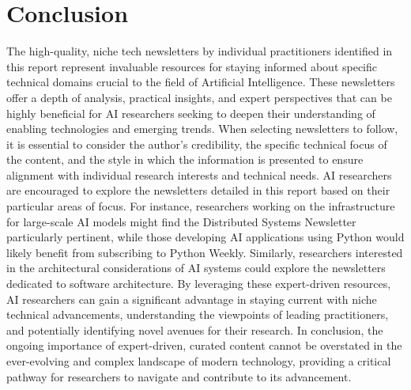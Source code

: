 \documentclass[11pt]{article}
\begin{document}
\section{Conclusion}
The high-quality, niche tech newsletters by individual practitioners identified in this report represent invaluable resources for staying informed about specific technical domains crucial to the field of Artificial Intelligence. These newsletters offer a depth of analysis, practical insights, and expert perspectives that can be highly beneficial for AI researchers seeking to deepen their understanding of enabling technologies and emerging trends. When selecting newsletters to follow, it is essential to consider the author's credibility, the specific technical focus of the content, and the style in which the information is presented to ensure alignment with individual research interests and technical needs. AI researchers are encouraged to explore the newsletters detailed in this report based on their particular areas of focus. For instance, researchers working on the infrastructure for large-scale AI models might find the Distributed Systems Newsletter particularly pertinent, while those developing AI applications using Python would likely benefit from subscribing to Python Weekly. Similarly, researchers interested in the architectural considerations of AI systems could explore the newsletters dedicated to software architecture. By leveraging these expert-driven resources, AI researchers can gain a significant advantage in staying current with niche technical advancements, understanding the viewpoints of leading practitioners, and potentially identifying novel avenues for their research. In conclusion, the ongoing importance of expert-driven, curated content cannot be overstated in the ever-evolving and complex landscape of modern technology, providing a critical pathway for researchers to navigate and contribute to its advancement.


\end{document}
